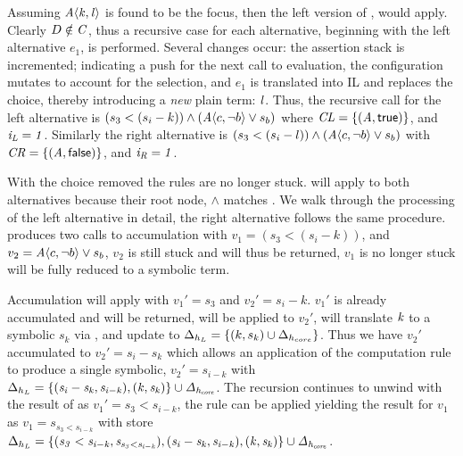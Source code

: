 Assuming $\kf{\chc[A]{k,l}}$ is found to be the focus, then the left version of
,  would apply. Clearly $D \notin
\mathit{C}{}$, thus a recursive case for each alternative, beginning with
the left alternative $e_{1}$, is performed. Several changes occur: the assertion
stack is incremented; indicating a push for the next call to evaluation, the
configuration mutates to account for the selection, and $e_{1}$ is translated
into IL and replaces the choice, thereby introducing a \textit{new} plain term:
$\mathit{l}$. Thus, the recursive call for the left alternative is $(s_{3} < (s_{i}
- k)) \wedge (\chc[A]{c,\neg b} \vee s_{b})$ where $\configuration{\kf{L}} =
\{(\kf{A}, \true{})\}$, and $\mathit{i_{\mathit{L}} = 1}$. Similarly the right
alternative is $(s_{3} < (s_{i} - l)) \wedge (\chc[A]{c,\neg b} \vee s_{b})$
with $\configuration{\kf{R}} = \{(\kf{A}, \false{})\}$, and $\mathit{i_{R} = 1}$.

With the choice removed the rules are no longer stuck.  will
apply to both alternatives because their root node, $\wedge$ matches
\boolFuncs{}. We walk through the processing of the left alternative in detail,
the right alternative follows the same procedure.  produces two
calls to accumulation with $v_{1} = (s_{3} < (s_{i} - k))$, and $v_{2} =
\chc[A]{c,\neg b} \vee s_{b}$, $v_{2}$ is still stuck and will thus be returned,
$v_{1}$ is no longer stuck will be fully reduced to a symbolic term.

Accumulation will apply  with $v_{1}' = s_{3}$ and $v_{2}' = s_{i}
- k$. $v_{1}'$ is already accumulated and will be returned, 
will be applied to $v_{2}'$, will translate $\mathit{k}$ to a symbolic $s_{k}$ via
, and update  to $\Delta_{h_{L}} = \{(k, s_{k})
\cup \Delta_{h_{core}}\}$. Thus we have $v_{2}'$ accumulated to $v_{2}' = s_{i}
- s_{k}$ which allows an application of the computation rule 
to produce a single symbolic, $v_{2}' = s_{i-k}$ with $\Delta_{h_{L}} =
\mathit{\{(s_{i} - s_{k}, s_{i-k}), (k,s_{k})\} \cup \Delta_{h_{core}}}$. The
recursion continues to unwind with the result of  as $v_{1}' =
s_{3} < s_{i-k}$, the rule  can be applied yielding the result
for $v_{1}$ as $v_{1} = s_{s_{3}<s_{i-k}}$ with store $\Delta_{h_{L}} =
\mathit{\{(s_{3} < s_{i-k}, s_{s_{3}<s_{i-k}}), (s_{i} - s_{k}, s_{i-k}),
  (k,s_{k})\} \cup \Delta_{h_{core}}}$.

